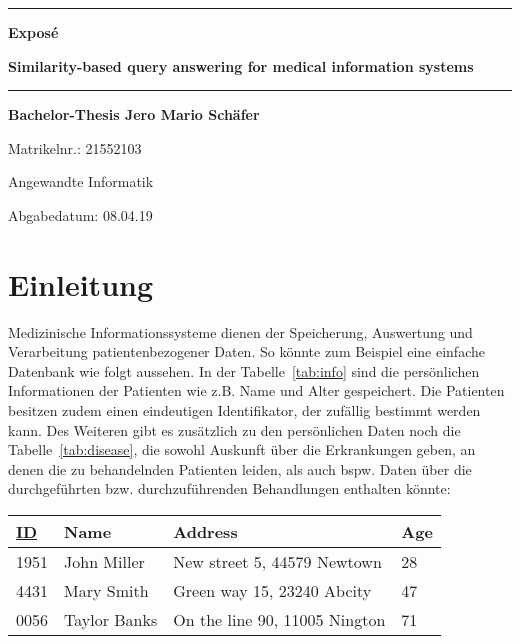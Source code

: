 \documentclass[a4paper, 11pt]{article}
\begin{document}
\newpage
\thispagestyle{empty}
\newcommand{\Rule}{\rule{\textwidth}{1mm}}

\begin{center}

\Rule\vspace{5mm}
\sffamily\bfseries\LARGE Exposé \par
\sffamily\bfseries\Huge Similarity-based query answering for medical information systems
\vspace{1mm}\Rule
\vfill
\sffamily\bfseries\LARGE Bachelor-Thesis
\vfill
\sffamily\bfseries\Large Jero Mario Schäfer\par Matrikelnr.: 21552103\par Angewandte Informatik\par
\vfill

\raisebox{7mm}{Georg-August-Universität}
\raisebox{7mm}{Göttingen}\par
\vfill
Abgabedatum: 08.04.19
\end{center}




\newpage
\section{Einleitung}

Medizinische Informationssysteme dienen der Speicherung, Auswertung und Verarbeitung patientenbezogener Daten. So könnte zum Beispiel eine einfache Datenbank
wie folgt aussehen. In der Tabelle~\ref{tab:info} sind die persönlichen Informationen der Patienten wie z.B. Name und Alter gespeichert. Die 
Patienten besitzen zudem einen eindeutigen Identifikator, der zufällig bestimmt werden kann. Des Weiteren gibt es zusätzlich zu den persönlichen Daten noch
die Tabelle~\ref{tab:disease}, die sowohl Auskunft über die Erkrankungen geben, an denen die zu behandelnden Patienten leiden, als auch bspw. Daten über die
durchgeführten bzw. durchzuführenden Behandlungen enthalten könnte: 
\\
\newcommand{\textoverline}[1]{$\overline{\mbox{#1}}$}
\begin{center}
\begin{tabular}{*{4}l} 
     \underline{ID} & Name & Address & Age \\
     \hline
     1951 & John Miller & New street 5, 44579 Newtown & 28 \\
     4431 & Mary Smith & Green way 15, 23240 Abcity & 47 \\
     0056 & Taylor Banks & On the line 90, 11005 Nington & 71 \\
\end{tabular}
 \label{tab:info}
\end{center}
\end{document}
